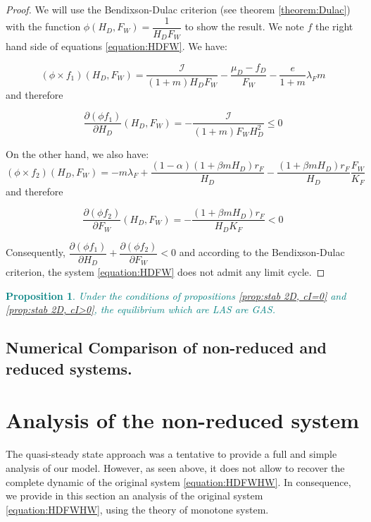 \documentclass{article}
\newcommand{\lfw}{\lambda_{F}}
\newcommand{\lfw}{\lambda_{F}}
\newcommand{\cI}{\mathcal{I}}
\newcommand{\marc}[1]{\textcolor{teal}{#1}}
\newtheorem{prop}{Proposition}
\begin{document}
\begin{proof}
We will use the Bendixson-Dulac criterion (see theorem \ref{theorem:Dulac}) with the function $\phi(H_D, F_W) = \dfrac{1}{H_D F_W}$ to show the result. We note $f$ the right hand side of equations \eqref{equation:HDFW}. We have:

\begin{equation*}
(\phi \times f_1)(H_D, F_W) = \dfrac{\cI}{(1+m)H_D F_W} -\dfrac{\mu_D - f_D}{F_W} - \dfrac{e}{1+m}\lfw m
\end{equation*} and therefore

\begin{equation*}
\dfrac{\partial (\phi f_1)}{\partial H_D}(H_D, F_W) = - \dfrac{\cI}{(1+m)F_W H_D^2} \leq 0
\end{equation*}

On the other hand, we also have:
\begin{equation*}
(\phi \times f_2)(H_D, F_W) = - m \lfw + \dfrac{(1-\alpha) (1+ \beta m H_D) r_F}{H_D} - \dfrac{(1+\beta m H_D) r_F}{H_D} \dfrac{F_W}{K_F}
\end{equation*} and therefore

\begin{equation*}
\dfrac{\partial (\phi f_2)}{\partial F_W}(H_D, F_W) = - \dfrac{(1+\beta m H_D) r_F}{H_D K_F} <0
\end{equation*}

Consequently, $\dfrac{\partial (\phi f_1)}{\partial H_D} + \dfrac{\partial (\phi f_2)}{\partial F_W} < 0$ and according to the Bendixson-Dulac criterion, the system \eqref{equation:HDFW} does not admit any limit cycle.

\end{proof}

\marc{
\begin{prop}
Under the conditions of propositions \ref{prop:stab 2D, cI=0} and \ref{prop:stab 2D, cI>0}, the equilibrium which are LAS are GAS.
\end{prop}
}

\subsection{Numerical Comparison of non-reduced and reduced systems.}


\section{Analysis of the non-reduced system}
The quasi-steady state approach was a tentative to provide a full and simple analysis of our model. However, as seen above, it does not allow to recover the complete dynamic of the original system \eqref{equation:HDFWHW}. In consequence, we provide in this section an analysis of the original system \eqref{equation:HDFWHW}, using the theory of monotone system.
\end{document}
